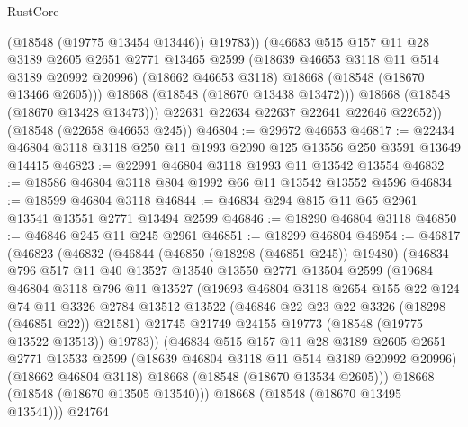 \begin{lexlean}{RustCore}
\begin{coremodule}
                (@18548 (@19775 @13454 @13446))
                @19783))
            (@46683
              @515
              @157
              @11
              @28
              @3189
              @2605
              @2651
              @2771
              @13465
              @2599
              (@18639 @46653 @3118 @11 @514 @3189 @20992 @20996)
              (@18662 @46653 @3118)
              @18668
              (@18548 (@18670 @13466 @2605)))
            @18668
            (@18548 (@18670 @13438 @13472)))
          @18668
          (@18548 (@18670 @13428 @13473)))
        @22631
        @22634
        @22637
        @22641
        @22646
        @22652))
    (@18548 (@22658 @46653 @245))
@46804 := @29672 @46653
@46817 := @22434 @46804 @3118 @3118 @250 @11 @1993 @2090 @125 @13556 @250 @3591 @13649 @14415
@46823 := @22991 @46804 @3118 @1993 @11 @13542 @13554
@46832 := @18586 @46804 @3118 @804 @1992 @66 @11 @13542 @13552 @4596
@46834 := @18599 @46804 @3118
@46844 := @46834 @294 @815 @11 @65 @2961 @13541 @13551 @2771 @13494 @2599
@46846 := @18290 @46804 @3118
@46850 := @46846 @245 @11 @245 @2961
@46851 := @18299 @46804
@46954 := @46817
    (@46823
      (@46832
        (@46844
          (@46850 (@18298 (@46851 @245)) @19480)
          (@46834
            @796
            @517
            @11
            @40
            @13527
            @13540
            @13550
            @2771
            @13504
            @2599
            (@19684
              @46804
              @3118
              @796
              @11
              @13527
              (@19693
                @46804
                @3118
                @2654
                @155
                @22
                @124
                @74
                @11
                @3326
                @2784
                @13512
                @13522
                (@46846 @22 @23 @22 @3326 (@18298 (@46851 @22)) @21581)
                @21745
                @21749
                @24155
                @19773
                (@18548 (@19775 @13522 @13513))
                @19783))
            (@46834
              @515
              @157
              @11
              @28
              @3189
              @2605
              @2651
              @2771
              @13533
              @2599
              (@18639 @46804 @3118 @11 @514 @3189 @20992 @20996)
              (@18662 @46804 @3118)
              @18668
              (@18548 (@18670 @13534 @2605)))
            @18668
            (@18548 (@18670 @13505 @13540)))
          @18668
          (@18548 (@18670 @13495 @13541)))
        @24764

\end{coremodule}
\end{lexlean}
